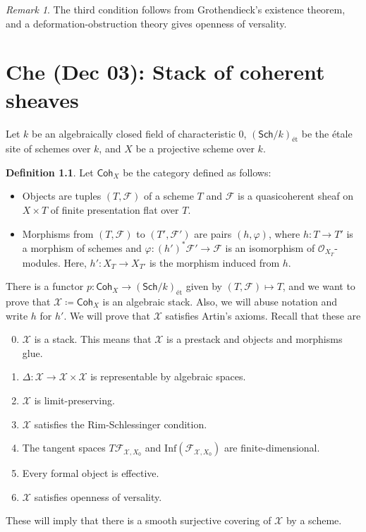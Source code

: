 \documentclass[leqno, openany]{memoir}
\theoremstyle{definition}
\newtheorem{defn}[thm]{Definition}
\theoremstyle{remark}
\newtheorem{rmk}[thm]{Remark}
\theoremstyle{plain}
\theoremstyle{definition}
\theoremstyle{remark}
\newcommand{\mc}[1]{\mathcal{#1}}
\newcommand{\mr}[1]{\mathrm{#1}}
\newcommand{\ms}[1]{\mathsf{#1}}
\begin{document}
\begin{rmk}
    The third condition follows from Grothendieck's existence theorem, and a deformation-obstruction theory gives openness of versality.
\end{rmk}

\chapter{Che (Dec 03): Stack of coherent sheaves}%
\label{cha:che_dec_03_stack_of_coherent_sheaves}

Let $k$ be an algebraically closed field of characteristic $0$, $(\ms{Sch}/k)_{\text{\'et}}$ be the \'etale site of schemes over $k$, and $X$ be a projective scheme over $k$.

\begin{defn}
    Let $\ms{Coh}_X$ be the category defined as follows:
    \begin{itemize}
        \item Objects are tuples $(T, \mc{F})$ of a scheme $T$ and $\mc{F}$ is a quasicoherent sheaf on $X \times T$ of finite presentation flat over $T$.
        \item Morphisms from $(T, \mc{F})$ to $(T', \mc{F}')$ are pairs $(h, \varphi)$, where $h \colon T \to T'$ is a morphism of schemes and $\varphi \colon (h')^* \mc{F}' \to \mc{F}$ is an isomorphism of $\mc{O}_{X_T}$-modules. Here, $h' \colon X_T \to X_{T'}$ is the morphism induced from $h$.
    \end{itemize}
\end{defn}

There is a functor $p \colon \ms{Coh}_X \to (\ms{Sch}/k)_{\text{\'et}}$ given by $(T,\mc{F}) \mapsto T$, and we want to prove that $\mc{X} \coloneqq \ms{Coh}_X$ is an algebraic stack. Also, we will abuse notation and write $h$ for $h'$. We will prove that $\mc{X}$ satisfies Artin's axioms. Recall that these are
\begin{enumerate}[(1)]\setcounter{enumi}{-1}
    \item $\mc{X}$ is a stack. This means that $\mc{X}$ is a prestack and objects and morphisms glue.
    \item $\Delta \colon \mc{X} \to \mc{X} \times \mc{X}$ is representable by algebraic spaces.
    \item $\mc{X}$ is limit-preserving.
    \item $\mc{X}$ satisfies the Rim-Schlessinger condition.
    \item The tangent spaces $T \mc{F}_{\mc{X}, X_0}$ and $\mr{Inf}(\mc{F}_{\mc{X}, X_0})$ are finite-dimensional.
    \item Every formal object is effective.
    \item $\mc{X}$ satisfies openness of versality.
\end{enumerate}
These will imply that there is a smooth surjective covering of $\mc{X}$ by a scheme.
\end{document}

